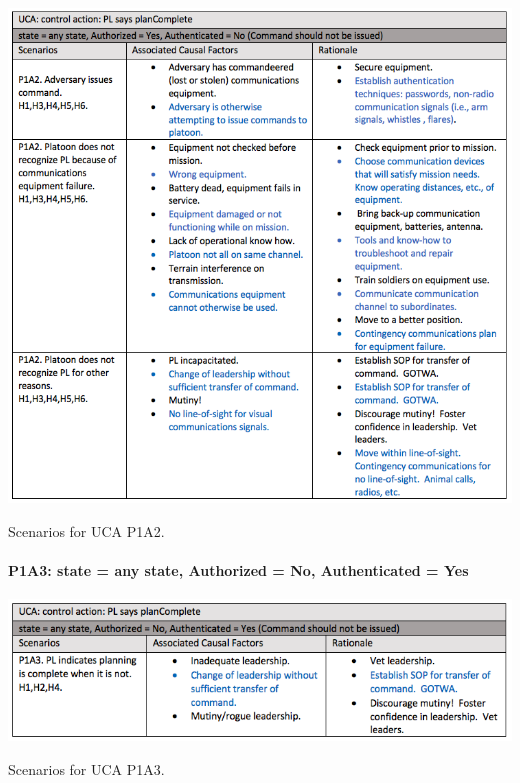 \documentclass[../../main/main.tex]{subfiles}
\begin{document}
\begin{table}[ht!]
\begin{center}
\includegraphics[width=\linewidth]{../figures/ucap1a2}
\caption{Scenarios for UCA P1A2.}
\label{ucap1a2}
\end{center}
\end{table}

\clearpage
\paragraph*{P1A3: state  = any state, Authorized = No, Authenticated = Yes}

\begin{table}[ht!]
\begin{center}
\includegraphics[width=\linewidth]{../figures/ucap1a3}
\caption{Scenarios for UCA P1A3.}
\label{ucap1a3}
\end{center}
\end{table}
\end{document}
